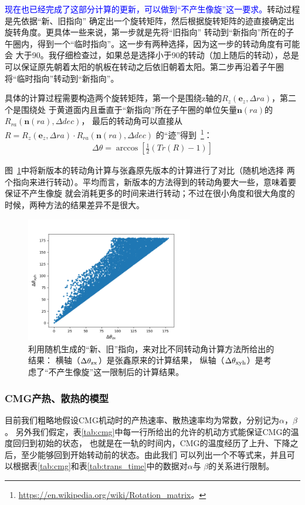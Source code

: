 \documentclass[a4paper,11pt]{ctexart}
\newcommand{\BT}[1]{\textcolor{blue}{#1}}
\begin{document}
\BT{\heiti 现在也已经完成了这部分计算的更新，可以做到“不产生像旋”这一要求。}转动过程是先依据“新、旧指向”
确定出一个旋转矩阵，然后根据旋转矩阵的迹直接确定出旋转角度。更具体一些来说，第一步就是先将“旧指向”
转动到“新指向”所在的子午圈内，得到一个“临时指向”。这一步有两种选择，因为这一步的转动角度有可能会
大于90\textdegree。我仔细检查过，如果总是选择小于90\textdegree 的转动（加上随后的转动），总是
可以保证原先朝着太阳的帆板在转动之后依旧朝着太阳。第二步再沿着子午圈将“临时指向”转动到“新指向”。

具体的计算过程需要构造两个旋转矩阵，第一个是围绕z轴的$R_z(\bm{e}_z,\Delta ra)$，第二个是围绕处
于黄道面内且垂直于“新指向”所在子午圈的单位矢量$\bm{n}(ra)$的$R_{ra}(\bm{n}(ra),\Delta dec)$，
最后的转动角可以直接从$R=R_z(\bm{e}_z,\Delta ra)\cdot R_{ra}(\bm{n}(ra),\Delta dec)$
的“迹”得到~\footnote{\url{https://en.wikipedia.org/wiki/Rotation_matrix}。}：
\begin{eqnarray}
\Delta\theta = \arccos \left[ \frac{1}{2}(Tr(R)-1) \right]
\end{eqnarray}

图~\ref{fig:cmp_cmg_rot}中将新版本的转动角计算与张鑫原先版本的计算进行了对比（随机地选择
两个指向来进行转动）。平均而言，新版本的方法得到的转动角要大一些，意味着要保证不产生像旋
就会消耗更多的时间来进行转动；不过在很小角度和很大角度的时候，两种方法的结果差异不是很大。

\begin{figure}[h!]
\centering
\includegraphics[width=0.65\textwidth]{figures/cmp_cmg_rot}
\caption{利用随机生成的“新、旧”指向，来对比不同转动角计算方法所给出的结果：
横轴（$\Delta\theta_{\rm zx}$）是张鑫原来的计算结果，
纵轴（$\Delta\theta_{\rm xyh}$）是考虑了“不产生像旋”这一限制后的计算结果。}
\label{fig:cmp_cmg_rot}
\end{figure}

\subsubsection{CMG产热、散热的模型}
目前我们粗略地假设CMG机动时的产热速率、散热速率均为常数，分别记为$\alpha$，$\beta$。
另外我们假定，表\ref{tab:cmg}中每一行所给出的允许的机动方式能保证CMG的温度回归到初始的状态，
也就是在一轨的时间内，CMG的温度经历了上升、下降之后，至少能够回到开始转动前的状态。由此我们
可以列出一个不等式来，并且可以根据表\ref{tab:cmg}和表\ref{tab:trans_time}中的数据对$\alpha$与
$\beta$的关系进行限制。
\end{document}
